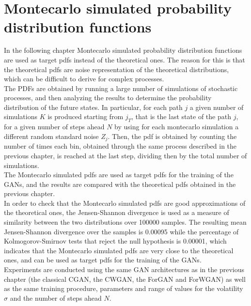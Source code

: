 \chapter{Montecarlo simulated probability distribution functions}

In the following chapter Montecarlo simulated probability distribution functions are used 
as target pdfs instead of the theoretical ones.
The reason for this is that the theoretical pdfs are noise representation of the theoretical distributions,
which can be difficult to derive for complex processes.\\
The PDFs are obtained by running a large number of simulations of stochastic processes, and then analyzing the results to determine the probability distribution of the future states.
In particular, for each path $j$ a given number of simulations $K$ is produced starting from $j_T$, that is the last state of the path $j$, for a given number of steps ahead $N$ by using for each montecarlo simulation a different random standard noise $Z_j$. 
Then, the pdf is obtained by counting the number of times each bin, obtained through the same process described in the previous chapter, is reached at the last step, dividing then by the total number of simulations.\\
The Montecarlo simulated pdfs are used as target pdfs for the training of the GANs, and the results are compared with the theoretical pdfs obtained in the previous chapter.\\

In order to check that the Montecarlo simulated pdfs are good approximations of the theoretical ones, the Jensen-Shannon divergence is used as a measure of similarity between the two distributions over 100000 samples.
The resulting mean Jensen-Shannon divergence over the samples is  0.00095 while the percentage of 
Kolmogorov-Smirnov tests that reject the null hypothesis is 0.00001, which indicates that the Montecarlo simulated pdfs are very close to the theoretical ones, and can be used as target pdfs for the training of the GANs.\\

Experiments are conducted using the same GAN architectures as in the previous chapter (the classical CGAN, the CWGAN, the ForGAN and ForWGAN) as well as the same training procedure, parameters and range of values for the volatility $\sigma$ and the number of steps ahead $N$.

